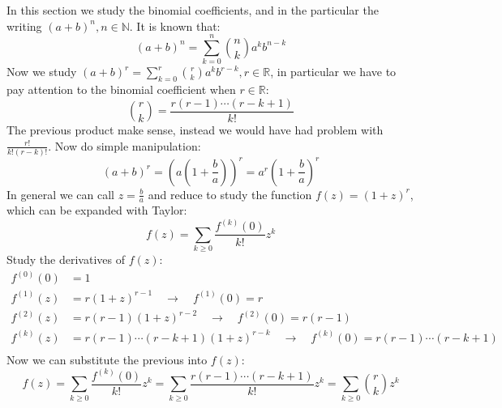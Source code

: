 In this section we study the binomial coefficients, and in the
particular the writing $(a + b)^n, n\in \mathbb{N}$. It is known that:
\begin{displaymath}
  (a+b)^n = \sum_{k=0}^{n}{{{n}\choose{k}}a^k b^{n-k} } 
\end{displaymath}
Now we study $(a + b)^r = \sum_{k=0}^{r}{{{r}\choose{k}}a^k b^{r-k} },
r\in \mathbb{R}$, in particular we have to pay attention to the
binomial coefficient when $r\in \mathbb{R}$:
\begin{displaymath}
  {{r}\choose{k}}  = \frac{r(r-1)\cdots(r-k+1)}{k!}
\end{displaymath}
The previous product make sense, instead we would have had problem
with $ \frac{r!}{k!(r-k)!} $. Now do simple manipulation:
\begin{displaymath}
  (a+b)^r = \left( a\left(1 +  \frac{b}{a}\right)\right)^r =
  a^r \left(1 +  \frac{b}{a}\right)^r
\end{displaymath}
In general we can call $z= \frac{b}{a} $ and reduce to study the
function $f(z)=(1+z)^r$, which can be expanded with Taylor:
\begin{displaymath}
  f(z) = \sum_{k \geq 0}{ \frac{f^{(k)}(0)}{k!} z^k } 
\end{displaymath}
Study the derivatives of $f(z)$:
\begin{displaymath}
  \begin{split}
    f^{(0)}(0) &= 1 \\
    f^{(1)}(z) &= r(1+z)^{r-1} \quad \rightarrow
    \quad f^{(1)}(0) =    r\\
    f^{(2)}(z) &= r(r-1)(1+z)^{r-2} \quad \rightarrow
    \quad f^{(2)}(0) = r(r-1)\\
    f^{(k)}(z) &= r(r-1)\cdots(r-k+1)(1+z)^{r-k}
    \quad \rightarrow \quad f^{(k)}(0) = r(r-1)\cdots(r-k+1)\\
  \end{split}
\end{displaymath}
Now we can substitute the previous into $f(z)$:
\begin{displaymath}
  f(z) = \sum_{k \geq 0}{ \frac{f^{(k)}(0)}{k!} z^k } =
  \sum_{k \geq 0}{ \frac{r(r-1)\cdots(r-k+1)}{k!} z^k } =
  \sum_{k \geq 0}{ {{r}\choose{k}} z^k }
\end{displaymath}

